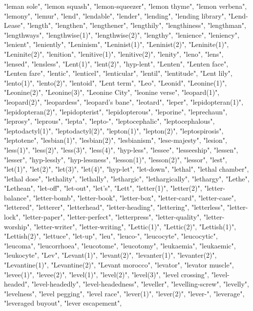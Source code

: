 "leman sole",
"lemon squash",
"lemon-squeezer",
"lemon thyme",
"lemon verbena",
"lemony",
"lemur",
"lend",
"lendable",
"lender",
"lending",
"lending library",
"Lend-Lease",
"length",
"lengthen",
"lengthener",
"lengthily",
"lengthiness",
"lengthman",
"lengthways",
"lengthwise(1)",
"lengthwise(2)",
"lengthy",
"lenience",
"leniency",
"lenient",
"leniently",
"Leninism",
"Leninist(1)",
"Leninist(2)",
"Leninite(1)",
"Leninite(2)",
"lenition",
"lenitive(1)",
"lenitive(2)",
"lenity",
"leno",
"lens",
"lensed",
"lensless",
"Lent(1)",
"lent(2)",
"hyp-lent",
"Lenten",
"Lenten face",
"Lenten fare",
"lentic",
"lenticel",
"lenticular",
"lentil",
"lentitude",
"Lent lily",
"lento(1)",
"lento(2)",
"lentoid",
"Lent term",
"Leo",
"Leonid",
"Leonine(1)",
"Leonine(2)",
"Leonine(3)",
"Leonine City",
"leonine verse",
"leopard(1)",
"leopard(2)",
"leopardess",
"leopard's bane",
"leotard",
"leper",
"lepidopteran(1)",
"lepidopteran(2)",
"lepidopterist",
"lepidopterous",
"leporine",
"leprechaun",
"leprosy",
"leprous",
"lepta",
"lepto-",
"leptocephalic",
"leptocephalous",
"leptodactyl(1)",
"leptodactyl(2)",
"lepton(1)",
"lepton(2)",
"leptospirosis",
"leptotene",
"lesbian(1)",
"lesbian(2)",
"lesbianism",
"lese-majesty",
"lesion",
"less(1)",
"less(2)",
"less(3)",
"less(4)",
"hyp-less",
"lessee",
"lesseeship",
"lessen",
"lesser",
"hyp-lessly",
"hyp-lessness",
"lesson(1)",
"lesson(2)",
"lessor",
"lest",
"let(1)",
"let(2)",
"let(3)",
"let(4)",
"hyp-let",
"let-down",
"lethal",
"lethal chamber",
"lethal dose",
"lethality",
"lethally",
"lethargic",
"lethargically",
"lethargy",
"Lethe",
"Lethean",
"let-off",
"let-out",
"let's",
"Lett",
"letter(1)",
"letter(2)",
"letter-balance",
"letter-bomb",
"letter-book",
"letter-box",
"letter-card",
"letter-case",
"lettered",
"letterer",
"letterhead",
"letter-heading",
"lettering",
"letterless",
"letter-lock",
"letter-paper",
"letter-perfect",
"letterpress",
"letter-quality",
"letter-worship",
"letter-writer",
"letter-writing",
"Lettic(1)",
"Lettic(2)",
"Lettish(1)",
"Lettish(2)",
"lettuce",
"let-up",
"leu",
"leuco-",
"leucocyte",
"leucocytic",
"leucoma",
"leucorrhoea",
"leucotome",
"leucotomy",
"leukaemia",
"leukaemic",
"leukocyte",
"Lev",
"Levant(1)",
"levant(2)",
"levanter(1)",
"levanter(2)",
"Levantine(1)",
"Levantine(2)",
"Levant morocco",
"levator",
"levator muscle",
"levee(1)",
"levee(2)",
"level(1)",
"level(2)",
"level(3)",
"level crossing",
"level-headed",
"level-headedly",
"level-headedness",
"leveller",
"levelling-screw",
"levelly",
"levelness",
"level pegging",
"level race",
"lever(1)",
"lever(2)",
"lever-",
"leverage",
"leveraged buyout",
"lever escapement",
